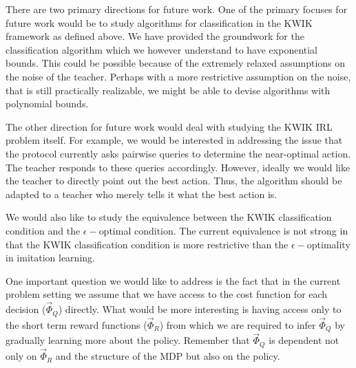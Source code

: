 
There are two primary directions for future work. One of the primary focuses for future work would be to study algorithms for classification in the KWIK framework as defined above. We have provided the groundwork for the classification algorithm which we however understand to have exponential bounds. This could be possible because of the extremely relaxed assumptions on the noise of the teacher. Perhaps with a more restrictive assumption on the noise, that is still practically realizable, we might be able to devise algorithms with polynomial bounds.

The other direction for future work would deal with studying the KWIK IRL problem itself. For example, we would be interested in addressing the issue that the protocol currently asks pairwise queries to determine the near-optimal action. The teacher responds to these queries accordingly. However, ideally we would like the teacher to directly point out the best action. Thus, the algorithm should be adapted to a teacher who merely tells it what the best action is.

We would also like to study the equivalence between the KWIK classification condition and the $\epsilon-$optimal condition. The current equivalence is not strong in that the KWIK classification condition is more restrictive than the $\epsilon-$optimality in imitation learning.

One important question we would like to address is the fact that in the current problem setting we assume that we have access to the cost function for each decision ($\vec{\Phi}_Q$) directly. What would be more interesting is having access only to the short term reward functions ($\vec{\Phi}_R$) from which we are required to infer   $\vec{\Phi}_Q$ by gradually learning more about the policy. Remember that $\vec{\Phi}_Q$  is dependent not only on $\vec{\Phi}_R$ and the structure of the MDP but also on the policy. 

